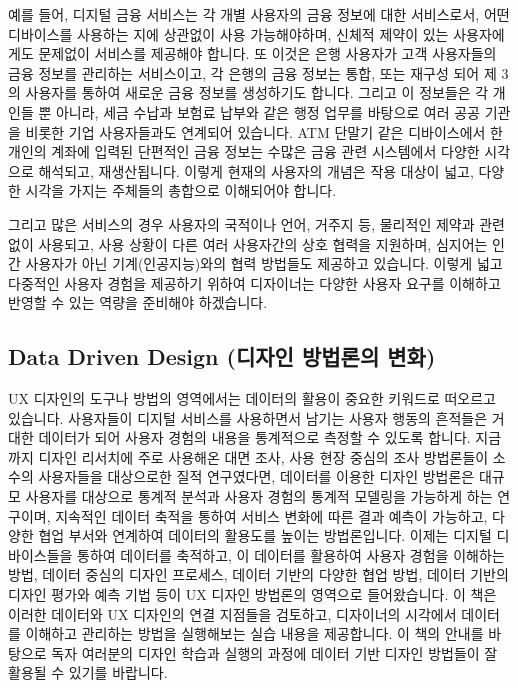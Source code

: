 \documentclass[
  letterpaper,
  DIV=11,
  numbers=noendperiod]{scrreprt}
\begin{document}
예를 들어, 디지털 금융 서비스는 각 개별 사용자의 금융 정보에 대한
서비스로서, 어떤 디바이스를 사용하는 지에 상관없이 사용 가능해야하며,
신체적 제약이 있는 사용자에게도 문제없이 서비스를 제공해야 합니다. 또
이것은 은행 사용자가 고객 사용자들의 금융 정보를 관리하는 서비스이고, 각
은행의 금융 정보는 통합, 또는 재구성 되어 제 3의 사용자를 통하여 새로운
금융 정보를 생성하기도 합니다. 그리고 이 정보들은 각 개인들 뿐 아니라,
세금 수납과 보험료 납부와 같은 행정 업무를 바탕으로 여러 공공 기관을
비롯한 기업 사용자들과도 연계되어 있습니다. ATM 단말기 같은 디바이스에서
한 개인의 계좌에 입력된 단편적인 금융 정보는 수많은 금융 관련 시스템에서
다양한 시각으로 해석되고, 재생산됩니다. 이렇게 현재의 사용자의 개념은
작용 대상이 넓고, 다양한 시각을 가지는 주체들의 총합으로 이해되어야
합니다.

그리고 많은 서비스의 경우 사용자의 국적이나 언어, 거주지 등, 물리적인
제약과 관련 없이 사용되고, 사용 상황이 다른 여러 사용자간의 상호 협력을
지원하며, 심지어는 인간 사용자가 아닌 기계(인공지능)와의 협력 방법들도
제공하고 있습니다. 이렇게 넓고 다중적인 사용자 경험을 제공하기 위하여
디자이너는 다양한 사용자 요구를 이해하고 반영할 수 있는 역량을 준비해야
하겠습니다.

\subsection{Data Driven Design (디자인 방법론의
변화)}\label{data-driven-design-uxb514uxc790uxc778-uxbc29uxbc95uxb860uxc758-uxbcc0uxd654}

UX 디자인의 도구나 방법의 영역에서는 데이터의 활용이 중요한 키워드로
떠오르고 있습니다. 사용자들이 디지털 서비스를 사용하면서 남기는 사용자
행동의 흔적들은 거대한 데이터가 되어 사용자 경험의 내용을 통계적으로
측정할 수 있도록 합니다. 지금까지 디자인 리서치에 주로 사용해온 대면
조사, 사용 현장 중심의 조사 방법론들이 소수의 사용자들을 대상으로한 질적
연구였다면, 데이터를 이용한 디자인 방법론은 대규모 사용자를 대상으로
통계적 분석과 사용자 경험의 통계적 모델링을 가능하게 하는 연구이며,
지속적인 데이터 축적을 통하여 서비스 변화에 따른 결과 예측이 가능하고,
다양한 협업 부서와 연계하여 데이터의 활용도를 높이는 방법론입니다.
이제는 디지털 디바이스들을 통하여 데이터를 축적하고, 이 데이터를
활용하여 사용자 경험을 이해하는 방법, 데이터 중심의 디자인 프로세스,
데이터 기반의 다양한 협업 방법, 데이터 기반의 디자인 평가와 예측 기법
등이 UX 디자인 방법론의 영역으로 들어왔습니다. 이 책은 이러한 데이터와
UX 디자인의 연결 지점들을 검토하고, 디자이너의 시각에서 데이터를
이해하고 관리하는 방법을 실행해보는 실습 내용을 제공합니다. 이 책의
안내를 바탕으로 독자 여러분의 디자인 학습과 실행의 과정에 데이터 기반
디자인 방법들이 잘 활용될 수 있기를 바랍니다.
\end{document}
